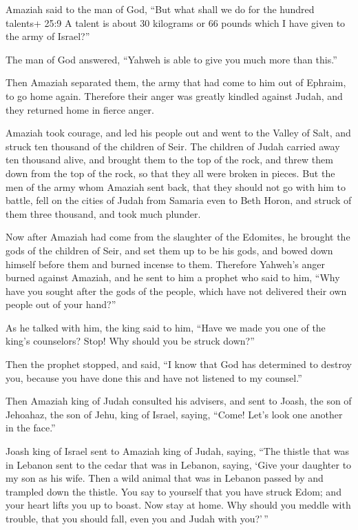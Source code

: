  Amaziah said to the man of God, ``But what shall we do for
the hundred talents+ 25:9 A talent is about 30 kilograms or 66 pounds
which I have given to the army of Israel?''

The man of God answered, ``Yahweh is able to give you much more than
this.''

 Then Amaziah separated them, the army that had come to him
out of Ephraim, to go home again. Therefore their anger was greatly
kindled against Judah, and they returned home in fierce anger.

 Amaziah took courage, and led his people out and went to
the Valley of Salt, and struck ten thousand of the children of Seir.
 The children of Judah carried away ten thousand alive, and
brought them to the top of the rock, and threw them down from the top of
the rock, so that they all were broken in pieces.  But the
men of the army whom Amaziah sent back, that they should not go with him
to battle, fell on the cities of Judah from Samaria even to Beth Horon,
and struck of them three thousand, and took much plunder.

 Now after Amaziah had come from the slaughter of the
Edomites, he brought the gods of the children of Seir, and set them up
to be his gods, and bowed down himself before them and burned incense to
them.  Therefore Yahweh's anger burned against Amaziah, and
he sent to him a prophet who said to him, ``Why have you sought after
the gods of the people, which have not delivered their own people out of
your hand?''

 As he talked with him, the king said to him, ``Have we
made you one of the king's counselors? Stop! Why should you be struck
down?''

Then the prophet stopped, and said, ``I know that God has determined to
destroy you, because you have done this and have not listened to my
counsel.''

 Then Amaziah king of Judah consulted his advisers, and
sent to Joash, the son of Jehoahaz, the son of Jehu, king of Israel,
saying, ``Come! Let's look one another in the face.''

 Joash king of Israel sent to Amaziah king of Judah,
saying, ``The thistle that was in Lebanon sent to the cedar that was in
Lebanon, saying, `Give your daughter to my son as his wife. Then a wild
animal that was in Lebanon passed by and trampled down the thistle.
 You say to yourself that you have struck Edom; and your
heart lifts you up to boast. Now stay at home. Why should you meddle
with trouble, that you should fall, even you and Judah with you?'\,''

